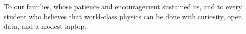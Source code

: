 \begin{dedication}
To our families, whose patience and encouragement sustained us, and to
every student who believes that world-class physics can be done with
curiosity, open data, and a modest laptop.
\end{dedication}
